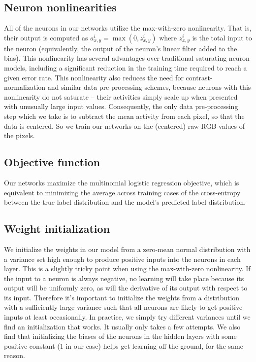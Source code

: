 \documentclass[12pt]{article}
\begin{document}
\subsection{Neuron nonlinearities}

All of the neurons in our networks utilize the max-with-zero nonlinearity.
That is, their output is computed as $a_{x,y}^{i}=\max(0,z_{x,y}^{i})$
where $z_{x,y}^{i}$ is the total input to the neuron (equivalently,
the output of the neuron's linear filter added to the bias). This nonlinearity has several
advantages over traditional saturating neuron models, including a
significant reduction in the training time required to reach a given
error rate. This nonlinearity also reduces the need for contrast-normalization
and similar data pre-processing schemes, because neurons with this
nonlinearity do not saturate -- their activities simply scale up when
presented with unusually large input values. Consequently, the only
data pre-processing step which we take is to subtract the mean activity
from each pixel, so that the data is centered. So we train our networks
on the (centered) raw RGB values of the pixels.


\subsection{Objective function}

Our networks maximize the multinomial logistic regression objective,
which is equivalent to minimizing the average across training cases
of the cross-entropy between the true label distribution and the model's
predicted label distribution.


\subsection{Weight initialization}

We initialize the weights in our model from a zero-mean normal distribution
with a variance set high enough to produce positive inputs into the
neurons in each layer. This is a slightly tricky point when using
the max-with-zero nonlinearity. If the input to a neuron is always
negative, no learning will take place because its output will be uniformly
zero, as will the derivative of its output with respect to its input.
Therefore it's important to initialize the weights from a distribution
with a sufficiently large variance such that all neurons are likely
to get positive inputs at least occasionally. In practice, we simply
try different variances until we find an initialization that works.
It usually only takes a few attempts. We also find that initializing
the biases of the neurons in the hidden layers with some positive
constant (1 in our case) helps get learning off the ground, for the
same reason.
\end{document}
